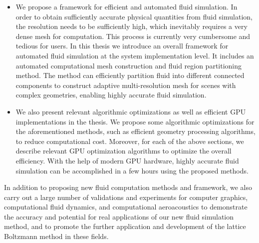 \begin{abstract*}[flattitle]
\begin{itemize}
    \item We propose a framework for efficient and automated fluid simulation. In order to obtain sufficiently accurate physical quantities from fluid simulation, the resolution needs to be sufficiently high, which inevitably requires a very dense mesh for computation. This process is currently very cumbersome and tedious for users. In this thesis we introduce an overall framework for automated fluid simulation at the system implementation level. It includes an automated computational mesh construction and fluid region partitioning method. The method can efficiently partition fluid into different connected components to construct adaptive multi-resolution mesh for scenes with complex geometries, enabling highly accurate fluid simulation.
    \item We also present relevant algorithmic optimizations as well as efficient GPU implementations in the thesis. We propose some algorithmic optimizations for the aforementioned methods, such as efficient geometry processing algorithms, to reduce computational cost. Moreover, for each of the above sections, we describe relevant GPU optimization algorithms to optimize the overall efficiency. With the help of modern GPU hardware, highly accurate fluid simulation can be accomplished in a few hours using the proposed methods.
  \end{itemize}

  In addition to proposing new fluid computation methods and framework, we also carry out a large number of validations and experiments for computer graphics, computational fluid dynamics, and computational aeroacoustics to demonstrate the accuracy and potential for real applications of our new fluid simulation method, and to promote the further application and development of the lattice Boltzmann method in these fields.
\end{abstract*}